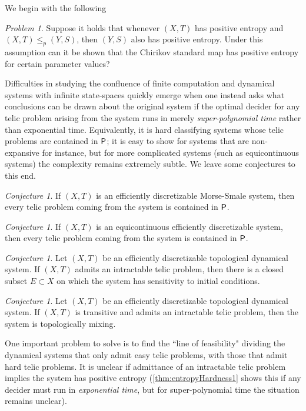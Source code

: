 \documentclass{amsart}
\theoremstyle{theorem}
\theoremstyle{remark}
\newtheorem{problem}[theorem]{Problem}
\newtheorem{conjecture}[theorem]{Conjecture}
\numberwithin{equation}{section}
\newcommand{\ccP}{\textsf{\upshape P}}
\begin{document}
We begin with the following

\begin{problem}
Suppose it holds that whenever $(X, T)$ has positive entropy and $(X, T) \leq_p (Y, S)$, then $(Y, S)$ also has positive entropy. Under this assumption can it be shown that the Chirikov standard map has positive entropy for certain parameter values?
\end{problem}

Difficulties in studying the confluence of finite computation and dynamical systems with infinite state-spaces quickly emerge when one instead asks what conclusions can be drawn about the original system if the optimal decider for any telic problem arising from the system runs in merely \emph{super-polynomial time} rather than exponential time. Equivalently, it is hard classifying systems whose telic problems are contained in $\ccP$; it is easy to show for systems that are non-expansive for instance, but for more complicated systems (such as equicontinuous systems) the complexity remains extremely subtle. We leave some conjectures to this end.

\begin{conjecture}
If $(X, T)$ is an efficiently discretizable Morse-Smale system, then every telic problem coming from the system is contained in $\ccP$.
\end{conjecture}

\begin{conjecture}
If $(X, T)$ is an equicontinuous efficiently discretizable system, then every telic problem coming from the system is contained in $\ccP$.
\end{conjecture}

\begin{conjecture}
Let $(X, T)$ be an efficiently discretizable topological dynamical system. If $(X, T)$ admits an intractable telic problem, then there is a closed subset $E \subset X$ on which the system has sensitivity to initial conditions.
\end{conjecture}

\begin{conjecture}
Let $(X, T)$ be an efficiently discretizable topological dynamical system. If $(X, T)$ is transitive and admits an intractable telic problem, then the system is topologically mixing.
\end{conjecture}

One important problem to solve is to find the ``line of feasibility" dividing the dynamical systems that only admit easy telic problems, with those that admit hard telic problems. It is unclear if admittance of an intractable telic problem implies the system has positive entropy (\cref{thm:entropyHardness1} shows this if any decider must run in \emph{exponential time}, but for super-polynomial time the situation remains unclear).
\end{document}
